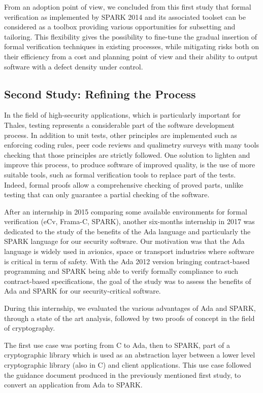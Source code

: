 \documentclass{llncs}
\begin{document}
From an adoption point of view, we concluded from this first study that formal
verification as implemented by SPARK 2014 and its associated toolset can be
considered as a toolbox providing various opportunities for subsetting and
tailoring. This flexibility gives the possibility to fine-tune the gradual
insertion of formal verification techniques in existing processes, while
mitigating risks both on their efficiency from a cost and planning point of
view and their ability to output software with a defect density under control.

\subsection{Second Study: Refining the Process}

In the field of high-security applications, which is particularly important for
Thales, testing represents a considerable part of the software development
process. In addition to unit tests, other principles are implemented such as
enforcing coding rules, peer code reviews and qualimetry surveys with many
tools checking that those principles are strictly followed. One solution to
lighten and improve this process, to produce software of improved quality, is
the use of more suitable tools, such as formal verification tools to replace
part of the tests. Indeed, formal proofs allow a comprehensive checking of
proved parts, unlike testing that can only guarantee a partial checking of the
software.

After an internship in 2015 comparing some available environments for formal
verification (eCv, Frama-C, SPARK), another six-months internship in 2017 was
dedicated to the study of the benefits of the Ada language and particularly the
SPARK language for our security software. Our motivation was that the Ada
language is widely used in avionics, space or transport industries where
software is critical in term of safety. With the Ada 2012 version bringing
contract-based programming and SPARK being able to verify formally compliance
to such contract-based specifications, the goal of the study was to assess the
benefits of Ada and SPARK for our security-critical software.

During this internship, we evaluated the various advantages of Ada and SPARK,
through a state of the art analysis, followed by two proofs of concept in the
field of cryptography.

The first use case was porting from C to Ada, then to SPARK, part of a
cryptographic library which is used as an abstraction layer between a lower
level cryptographic library (also in C) and client applications. This use case
followed the guidance document produced in the previously mentioned first
study, to convert an application from Ada to SPARK.
\end{document}

